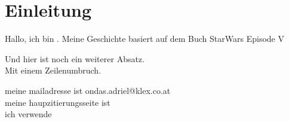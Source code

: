 \chapter{Einleitung}

Hallo, ich bin \@author. Meine Geschichte basiert auf dem Buch StarWars Episode V %

Und hier ist noch ein weiterer Absatz. \\
Mit einem Zeilenumbruch.

meine mailadresse ist ondas.adriel@klex.co.at\cite{KLEXKlusemannExtern}\\
meine haupzitierungsseite ist \cite{WikipediaFreieEnzyklopadie}\\
ich verwende \cite{ZoteroDownloads}